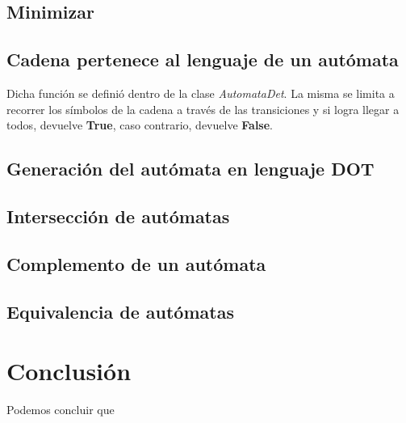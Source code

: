 \documentclass[a4paper, 10pt, twoside]{article}
\begin{document}
\subsection{Minimizar}

\subsection{Cadena pertenece al lenguaje de un autómata}
Dicha función se definió dentro de la clase \textit{AutomataDet}. La misma se limita a recorrer los símbolos de la cadena a través de las transiciones y si logra llegar a todos, devuelve \textbf{True}, caso contrario, devuelve \textbf{False}.

\subsection{Generación del autómata en lenguaje DOT}

\subsection{Intersección de autómatas}

\subsection{Complemento de un autómata}

\subsection{Equivalencia de autómatas}

\newpage
\section{Conclusión}
Podemos concluir que
\end{document}

